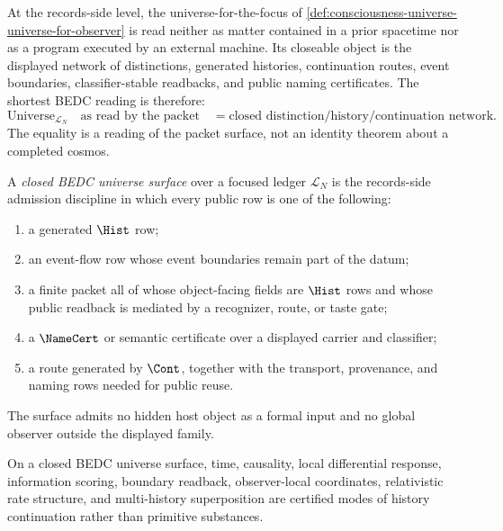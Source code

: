 \begin{principle}
\label{prin:consciousness-universe-closed-history-network}
At the records-side level, the universe-for-the-focus of \autoref{def:consciousness-universe-universe-for-observer} is read neither as matter contained in a prior spacetime nor as a program executed by an external machine. Its closeable object is the displayed network of distinctions, generated histories, continuation routes, event boundaries, classifier-stable readbacks, and public naming certificates. The shortest BEDC reading is therefore:
$$
\mathrm{Universe}_{\mathcal{L}_N}
\quad\text{as read by the packet}\quad
=
\text{closed distinction/history/continuation network}.
$$
The equality is a reading of the packet surface, not an identity theorem about a completed cosmos.
\end{principle}

\begin{definition}
\label{def:consciousness-universe-closed-bedc-universe-surface}
A \emph{closed BEDC universe surface} over a focused ledger $\mathcal{L}_N$ is the records-side admission discipline in which every public row is one of the following:
\begin{enumerate}
\item a generated $\Hist$ row;
\item an event-flow row whose event boundaries remain part of the datum;
\item a finite packet all of whose object-facing fields are $\Hist$ rows and whose public readback is mediated by a recognizer, route, or taste gate;
\item a $\NameCert$ or semantic certificate over a displayed carrier and classifier;
\item a route generated by $\Cont$, together with the transport, provenance, and naming rows needed for public reuse.
\end{enumerate}
The surface admits no hidden host object as a formal input and no global observer outside the displayed family.
\end{definition}

\begin{theorem}
\label{thm:consciousness-universe-closed-history-decomposition}
On a closed BEDC universe surface, time, causality, local differential response, information scoring, boundary readback, observer-local coordinates, relativistic rate structure, and multi-history superposition are certified modes of history continuation rather than primitive substances.
\end{theorem}

